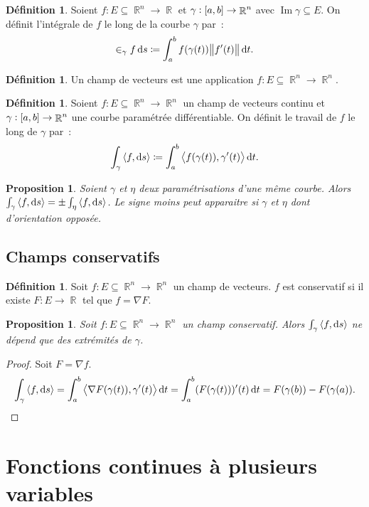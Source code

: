 \documentclass{article}
\DeclareMathOperator{\Imf}{Im}
\DeclareMathOperator{\R}{\mathbb R}
\newcommand{\scpr}[2]{{\left\langle#1, #2\right\rangle}}
\newcommand{\ab}{\interval ab}
\newtheorem{prp}[thm]{Proposition}
\theoremstyle{definition}
\newtheorem{déf}[thm]{Définition}
\theoremstyle{remark}
\begin{document}
		\begin{déf} Soient $f : E \subseteq \R^n \to \R$ et $\gamma : \ab \to \R^n$ avec $\Imf \gamma \subseteq E$. On définit l'intégrale de $f$ le
		long de la courbe $\gamma$ par~:
		\[\in_\gamma f\dif s \coloneqq \int_a^bf(\gamma(t))\norm{f'(t)}\dif t.\]
		\end{déf}

		\begin{déf} Un champ de vecteurs est une application $f : E \subseteq \R^n \to \R^n$. \end{déf}

		\begin{déf} Soient $f : E \subseteq \R^n \to \R^n$ un champ de vecteurs continu et $\gamma : \ab \to \R^n$ une courbe paramétrée différentiable.
		On définit le travail de $f$ le long de $\gamma$ par~:
		\[\int_\gamma\scpr f{\dif s} \coloneqq \int_a^b\scpr {f(\gamma(t))}{\gamma'(t)}\dif t.\]
		\end{déf}

		\begin{prp} Soient $\gamma$ et $\eta$ deux paramétrisations d'une même courbe. Alors $\int_\gamma\scpr f{\dif s} = \pm\int_\eta\scpr f{\dif s}$.
		Le signe moins peut apparaitre si $\gamma$ et $\eta$ dont d'orientation opposée. \end{prp}

	\subsection{Champs conservatifs}
		
		\begin{déf} Soit $f : E \subseteq \R^n \to \R^n$ un champ de vecteurs. $f$ est conservatif si il existe $F : E \to \R$ tel que $f = \nabla F$.
		\end{déf}

		\begin{prp} Soit $f : E \subseteq \R^n \to \R^n$ un champ conservatif. Alors $\int_\gamma\scpr f{\dif s}$ ne dépend que des extrémités de
		$\gamma$. \end{prp}

		\begin{proof} Soit $F = \nabla f$.
		\[\int_\gamma\scpr f{\dif s} = \int_a^b\scpr {\nabla F(\gamma(t))}{\gamma'(t)}\dif t = \int_a^b(F(\gamma(t)))'(t)\dif t = F(\gamma(b))-F(\gamma(a)).\]
		\end{proof}

\newpage
\section{Fonctions continues à plusieurs variables}
\end{document}
